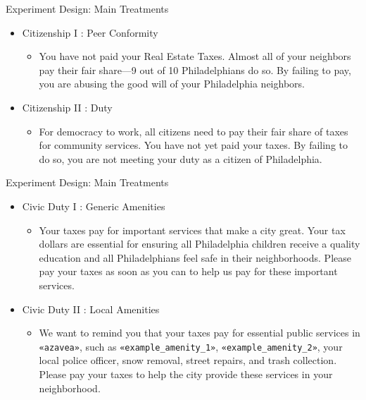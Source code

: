 \documentclass[ignorenonframetext,]{beamer}
\providecommand{\tightlist}{%
  \setlength{\itemsep}{0pt}\setlength{\parskip}{0pt}}
\begin{document}
\begin{frame}{Experiment Design: Main Treatments}

\begin{itemize}
\item
  Citizenship I : Peer Conformity

  \begin{itemize}
  \tightlist
  \item
    You have not paid your Real Estate Taxes. Almost all of your
    neighbors pay their fair share---9 out of 10 Philadelphians do so.
    By failing to pay, you are abusing the good will of your
    Philadelphia neighbors.
  \end{itemize}
\item
  Citizenship II : Duty

  \begin{itemize}
  \tightlist
  \item
    For democracy to work, all citizens need to pay their fair share of
    taxes for community services. You have not yet paid your taxes. By
    failing to do so, you are not meeting your duty as a citizen of
    Philadelphia.
  \end{itemize}
\end{itemize}

\end{frame}

\begin{frame}[fragile]{Experiment Design: Main Treatments}

\begin{itemize}
\item
  Civic Duty I : Generic Amenities

  \begin{itemize}
  \tightlist
  \item
    Your taxes pay for important services that make a city great. Your
    tax dollars are essential for ensuring all Philadelphia children
    receive a quality education and all Philadelphians feel safe in
    their neighborhoods. Please pay your taxes as soon as you can to
    help us pay for these important services.
  \end{itemize}
\item
  Civic Duty II : Local Amenities

  \begin{itemize}
  \tightlist
  \item
    We want to remind you that your taxes pay for essential public
    services in \texttt{«azavea»}, such as
    \texttt{«example\_amenity\_1»}, \texttt{«example\_amenity\_2»}, your
    local police officer, snow removal, street repairs, and trash
    collection. Please pay your taxes to help the city provide these
    services in your neighborhood.
  \end{itemize}
\end{itemize}

\end{frame}
\end{document}
